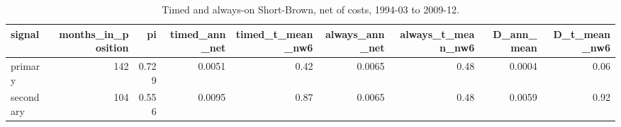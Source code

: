 \begin{table}[htbp]\centering\small
\caption{Timed and always-on Short-Brown, net of costs, 1994-03 to 2009-12.}
\label{tab:m8_summary}
\begin{tabular}{lrrrrrrrr}
\toprule
signal & months\_in\_position & pi & timed\_ann\_net & timed\_t\_mean\_nw6 & always\_ann\_net & always\_t\_mean\_nw6 & D\_ann\_mean & D\_t\_mean\_nw6 \\
\midrule
primary & 142 & 0.729 & 0.0051 & 0.42 & 0.0065 & 0.48 & 0.0004 & 0.06 \\
secondary & 104 & 0.556 & 0.0095 & 0.87 & 0.0065 & 0.48 & 0.0059 & 0.92 \\
\bottomrule
\end{tabular}
\end{table}
